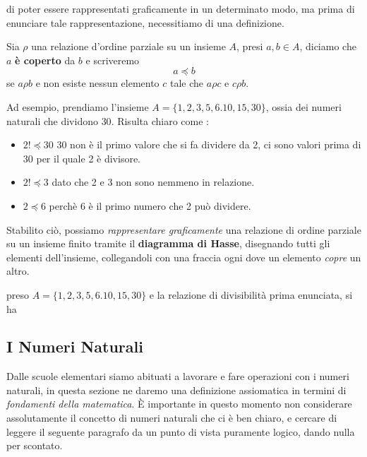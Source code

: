 \documentclass[12pt, letterpaper]{article}
\begin{document}
di poter essere rappresentati graficamente in un determinato modo, ma prima di enunciare tale rappresentazione,
necessitiamo di una definizione.
\begin{theorem}
    Sia \(\rho\) una relazione d'ordine parziale su un insieme \(A\), presi \(a,b \in A\), diciamo che 
    \(a\) \textbf{è coperto} da \(b\) e scriveremo \begin{equation}
        a\preccurlyeq b
    \end{equation}
    se \(a\rho b \) e non esiste nessun elemento \(c\) tale che \(a\rho c \) e \(c \rho b\).
\end{theorem}
Ad esempio, prendiamo l'insieme \(A  = \{1,2,3,5,6.10,15,30\}\), ossia dei numeri naturali che dividono \(30\).
Risulta chiaro come :
\begin{itemize}
    \item \(2 !\preccurlyeq 30\) 30 non è il primo valore che si fa 
    dividere da 2, ci sono valori prima di 30 per il quale 2 è divisore.
    \item \(2 !\preccurlyeq 3\) dato che 2 e 3 non sono nemmeno in relazione.
    \item \(2 \preccurlyeq 6\) perchè 6 è il primo numero che 2 può dividere. 
\end{itemize}
Stabilito ciò, possiamo \textit{rappresentare graficamente} una relazione di ordine parziale su un 
insieme finito tramite il \textbf{diagramma di Hasse}, disegnando tutti gli elementi dell'insieme, 
collegandoli con una fraccia ogni dove un elemento \textit{copre} un altro.
\\ \begin{center}
    preso \(A=\{1,2,3,5,6.10,15,30\}\) e la relazione di divisibilità prima enunciata, si ha
\end{center}
\begin{figure}[h]
\end{figure}
\newpage
\subsection{I Numeri Naturali}
Dalle scuole elementari siamo abituati a lavorare e fare operazioni con i numeri naturali, in questa 
sezione ne daremo una definizione assiomatica in termini di \textit{fondamenti della matematica}.
È importante in questo
momento non considerare assolutamente il concetto di numeri naturali che ci è ben chiaro, e cercare di leggere il seguente 
paragrafo da un punto di vista puramente logico, dando nulla per scontato.
\end{document}
